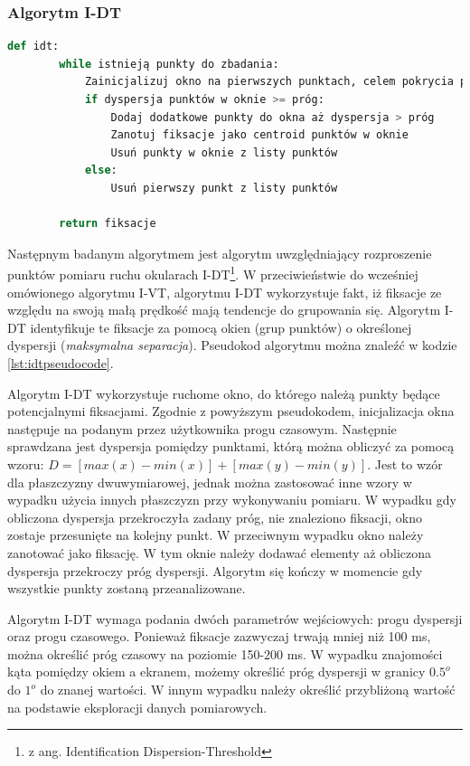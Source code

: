 \subsubsection{Algorytm I-DT}
\label{ssec:idt}
\begin{lstlisting}[language=Python, caption=Pseudokod algorytmu I-DT, label={lst:idtpseudocode}]
    def idt:
        while istnieją punkty do zbadania:
            Zainicjalizuj okno na pierwszych punktach, celem pokrycia progu czasowego.
            if dyspersja punktów w oknie >= próg:
                Dodaj dodatkowe punkty do okna aż dyspersja > próg
                Zanotuj fiksacje jako centroid punktów w oknie
                Usuń punkty w oknie z listy punktów
            else:
                Usuń pierwszy punkt z listy punktów
        
        return fiksacje
\end{lstlisting}
Następnym badanym algorytmem jest algorytm uwzględniający rozproszenie punktów pomiaru ruchu okularach I-DT\footnote{z ang. Identification Dispersion-Threshold}. W przeciwieństwie do wcześniej omówionego algorytmu I-VT, algorytmu I-DT wykorzystuje fakt, iż fiksacje ze względu na swoją małą prędkość mają tendencje do grupowania się. Algorytm I-DT identyfikuje te fiksacje za pomocą okien (grup punktów) o określonej dyspersji (\emph{maksymalna separacja}). Pseudokod algorytmu można znaleźć w kodzie \ref{lst:idtpseudocode}.\par
Algorytm I-DT wykorzystuje ruchome okno, do którego należą punkty będące potencjalnymi fiksacjami. Zgodnie z powyższym pseudokodem, inicjalizacja okna następuje na podanym przez użytkownika progu czasowym. Następnie sprawdzana jest dyspersja pomiędzy punktami, którą można obliczyć za pomocą wzoru: $D = [max(x) - min(x)] + [max(y) - min(y)]$. Jest to wzór dla płaszczyzny dwuwymiarowej, jednak można zastosować inne wzory w wypadku użycia innych płaszczyzn przy wykonywaniu pomiaru. W wypadku gdy obliczona dyspersja przekroczyła zadany próg, nie znaleziono fiksacji, okno zostaje przesunięte na kolejny punkt. W przeciwnym wypadku okno należy zanotować jako fiksację. W tym oknie należy dodawać elementy aż obliczona dyspersja przekroczy próg dyspersji. Algorytm się kończy w momencie gdy wszystkie punkty zostaną przeanalizowane.\par
Algorytm I-DT wymaga podania dwóch parametrów wejściowych: progu dyspersji oraz progu czasowego. Ponieważ fiksacje zazwyczaj trwają mniej niż 100 ms, można określić próg czasowy na poziomie 150-200 ms. W wypadku znajomości kąta pomiędzy okiem a ekranem, możemy określić próg dyspersji w granicy $0.5^o$ do $1^o$ do znanej wartości. W innym wypadku należy określić przybliżoną wartość na podstawie eksploracji danych pomiarowych.
